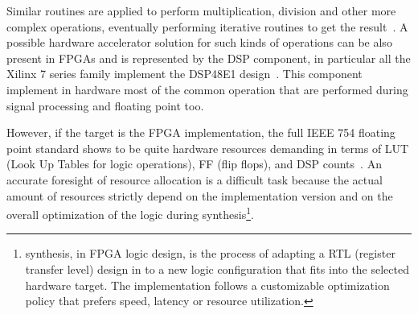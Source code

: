 
Similar routines are applied to perform multiplication, division and other more complex operations, eventually performing iterative routines to get the result~\cite{num_lut_for_fp}.
A possible hardware accelerator solution for such kinds of operations can be also present in FPGAs and is represented by the \ac{DSP} component, in particular all the Xilinx 7 series family implement the DSP48E1 design~\cite{xilinx_dsp}. 
This component implement in hardware most of the common operation that are performed during signal processing and floating point too.

However, if the target is the FPGA implementation, the full IEEE 754 floating point standard shows to be quite hardware resources demanding in terms of LUT (Look Up Tables for logic operations), FF (flip flops), and \acs{DSP} counts~\cite{1227254}. 
An accurate foresight of resource allocation is a difficult task because the actual amount of resources strictly depend on the implementation version and on the overall optimization of the logic during synthesis\footnote{ synthesis, in FPGA logic design, is the process of adapting a RTL (register transfer level) design in to a new logic configuration that fits into the selected hardware target. The implementation follows a customizable optimization policy that prefers speed, latency or resource utilization.}.

